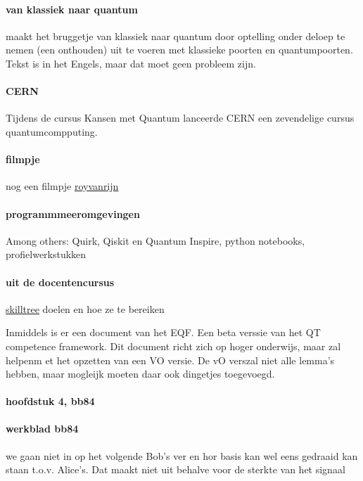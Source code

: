 \documentclass[../../main.tex]{subfiles}
\begin{document}
\paragraph{van klassiek naar quantum}
 maakt het bruggetje van klassiek naar quantum door optelling onder deloep te nemen (een onthouden) uit te voeren met klassieke poorten en quantumpoorten. Tekst is in het Engels, maar dat moet geen probleem zijn.

\paragraph{CERN}
Tijdens de cursus Kansen met Quantum lanceerde CERN een zevendelige cursus quantumcompputing.

\paragraph{filmpje} nog een filmpje \href{https://www.youtube.com/watch?v=RMeWqXdBHIg&amp;t=1780}{royvanrijn}

\paragraph{programmmeeromgevingen}
Among others: 
Quirk, Qiskit en Quantum Inspire, python notebooks, 
profielwerkstukken
\clearpage

\paragraph{uit de docentencursus}
\href{http://www.playbookgamification.nl/blog/meer-overzicht-en-autonomie-met-de-skilltree/}{skilltree} doelen en hoe ze te bereiken

Inmiddels is er een document van het EQF. Een beta verssie van het QT competence framework. Dit document richt zich op hoger onderwijs, maar zal helpenm et het opzetten van een VO versie. De vO verszal niet alle lemma's hebben, maar mogleijk moeten daar ook dingetjes toegevoegd.


\paragraph{hoofdstuk 4, bb84}

\paragraph{werkblad bb84}
we gaan niet in op het volgende Bob's ver en hor basis kan  wel eens gedraaid kan staan t.o.v. Alice's. Dat maakt niet uit behalve voor de sterkte van het signaal
\end{document}
